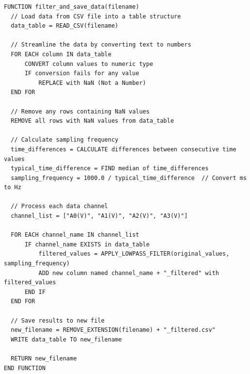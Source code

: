 \begin{lstlisting}[style=cstyle, caption=Python filter\_and\_save\_data() PseudoCode, label=lst:pythonFilterAndSave]
  FUNCTION filter_and_save_data(filename)
  // Load data from CSV file into a table structure
  data_table = READ_CSV(filename)
  
  // Streamline the data by converting text to numbers
  FOR EACH column IN data_table
      CONVERT column values to numeric type
      IF conversion fails for any value
          REPLACE with NaN (Not a Number)
  END FOR
  
  // Remove any rows containing NaN values
  REMOVE all rows with NaN values from data_table
  
  // Calculate sampling frequency
  time_differences = CALCULATE differences between consecutive time values
  typical_time_difference = FIND median of time_differences
  sampling_frequency = 1000.0 / typical_time_difference  // Convert ms to Hz
  
  // Process each data channel
  channel_list = ["A0(V)", "A1(V)", "A2(V)", "A3(V)"]
  
  FOR EACH channel_name IN channel_list
      IF channel_name EXISTS in data_table
          filtered_values = APPLY_LOWPASS_FILTER(original_values, sampling_frequency)
          ADD new column named channel_name + "_filtered" with filtered_values
      END IF
  END FOR
  
  // Save results to new file
  new_filename = REMOVE_EXTENSION(filename) + "_filtered.csv"
  WRITE data_table TO new_filename
  
  RETURN new_filename
END FUNCTION
\end{lstlisting}

